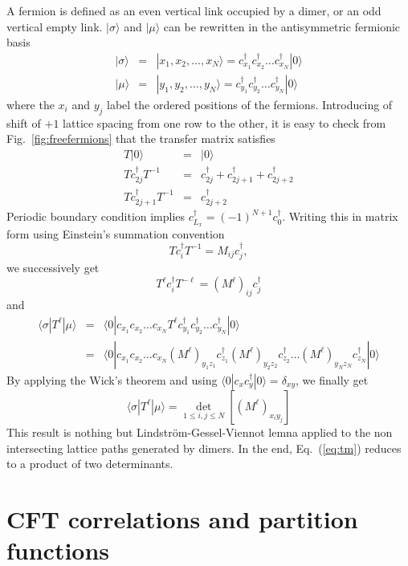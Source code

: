 \documentclass[11pt]{iopart}
\begin{document}
A fermion is defined as an even vertical link occupied by a dimer, or an odd vertical empty link. $|\sigma\rangle$ and $|\mu\rangle$ can be rewritten in the antisymmetric fermionic basis
\begin{eqnarray}
|\sigma \rangle&=&|x_1,x_2,\ldots,x_N\rangle=c_{x_1}^\dag c_{x_2}^\dag \ldots c_{x_N}^\dag |0\rangle \\
|\mu \rangle&=&|y_1,y_2,\ldots,y_N\rangle=c_{y_1}^\dag c_{y_2}^\dag \ldots c_{y_N}^\dag |0\rangle
\end{eqnarray}
where the $x_i$ and $y_j$ label the ordered positions of the fermions. Introducing of shift of $+1$ lattice spacing from one row to the other, it is easy to check from Fig.~\ref{fig:freefermions} that the transfer matrix satisfies
\begin{eqnarray}
T|0\rangle&=&|0\rangle\\
T c_{2j}^\dag T^{-1}&=&c_{2j}^\dag+c_{2j+1}^\dag +c_{2j+2}^\dag\\
T c_{2j+1}^\dag T^{-1}&=&c_{2j+2}^\dag
\end{eqnarray}
Periodic boundary condition implies $c_{L_x}^\dag=(-1)^{N+1}c_0^\dag$. Writing this in matrix form using Einstein's summation convention
\begin{equation}
 T c_i^\dag T^{-1}=M_{ij} c_j^\dag,
\end{equation}
we successively get
\begin{equation}
 T^\ell c_i^\dag T^{-\ell}=\left(M^\ell\right)_{ij} c_j^\dag
\end{equation}
and 
\begin{eqnarray}
\langle \sigma |T^\ell |\mu\rangle&=&\langle 0|c_{x_1} c_{x_2} \ldots c_{x_N} T^{\ell} c_{y_1}^\dag c_{y_2}^\dag \ldots c_{y_N}^\dag |0\rangle \\ 
&=&\langle 0|c_{x_1} c_{x_2} \ldots c_{x_N} (M^\ell)_{y_1 z_1}c_{z_1}^\dag (M^\ell)_{y_2 z_2}c_{z_2}^\dag \ldots (M^\ell)_{y_N z_N}c_{z_N}^\dag|0\rangle
\end{eqnarray}
By applying the Wick's theorem and using $\langle 0|c_x c_y^\dag|0\rangle=\delta_{xy}$, we finally get
\begin{equation}
 \langle \sigma |T^\ell |\mu\rangle=\det_{1\leq i,j\leq N} \left[(M^\ell)_{x_i y_j}\right]
\end{equation}
This result is nothing but Lindstr\"om-Gessel-Viennot\cite{Lindstrom1973,GesselViennot1989} lemna applied to the non intersecting lattice paths generated by dimers. In the end, Eq.~(\ref{eq:tm}) reduces to a product of two determinants. 
\section[\;\;\;\;\;\;\;\;\;\;\;\;\;\;CFT correlations and partition functions]{CFT correlations and partition functions}
\label{sec:CFT_Jacobi}
\end{document}
